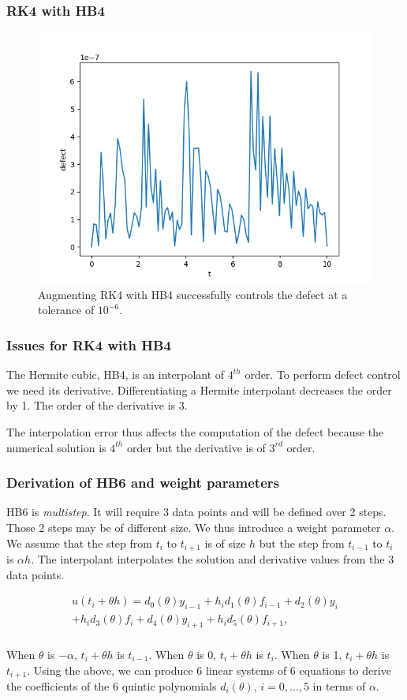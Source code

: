 \documentclass{beamer}
\begin{document}
\begin{frame}
\frametitle{RK4 with HB4}
\begin{figure}[H]
    \centering
    \includegraphics[width=0.7\linewidth]{./figures/rk4_with_hb4_p1_global_defect}
    \caption{Augmenting RK4 with HB4 successfully controls the defect at a tolerance of $10^{-6}$.}
    \label{fig:rk4_with_hb4_p1_global_defect}
\end{figure}
\end{frame}    

\begin{frame}
\frametitle{Issues for RK4 with HB4}
The Hermite cubic, HB4, is an interpolant of $4^{th}$ order.
To perform defect control we need its derivative.
Differentiating a Hermite interpolant decreases the order by 1.
The order of the derivative is 3. 

The interpolation error thus affects the computation of the defect because the numerical solution is $4^{th}$ order but the derivative is of $3^{rd}$ order.
\end{frame}

\begin{frame}
\frametitle{Derivation of HB6 and weight parameters}
HB6 is \emph{multistep}. It will require 3 data points and will be defined over 2 steps. Those 2 steps may be of different size. 
We thus introduce a weight parameter $\alpha$.
We assume that the step from $t_i$ to $t_{i + 1}$ is of size $h$ but the step from $t_{i - 1}$ to $t_i$ is $\alpha h$. 
The interpolant interpolates the solution and derivative values from the 3 data points.

\begin{equation}
\begin{split}
u(t_i + \theta h) = d_{0}(\theta) y_{i-1} +  h_id_{1}(\theta)f_{i-1}
+ d_{2}(\theta)y_i  \\   +  h_id_{3}(\theta)f_i
+ d_{4}(\theta)y_{i + 1} + h_id_{5}(\theta)f_{i + 1}, \\
\end{split}
\end{equation}

When $\theta$ is $-\alpha$, $t_i + \theta h$ is $t_{i - 1}$.
When $\theta$ is 0, $t_i + \theta h$ is $t_i$.
When $\theta$ is 1, $t_i + \theta h$ is $t_{i + 1}$.
Using the above, we can produce 6 linear systems of 6 equations to derive the coefficients of the 6 quintic polynomials $d_i(\theta)$, $i = 0, ..., 5$ in terms of $\alpha$.
\end{frame}
\end{document}
